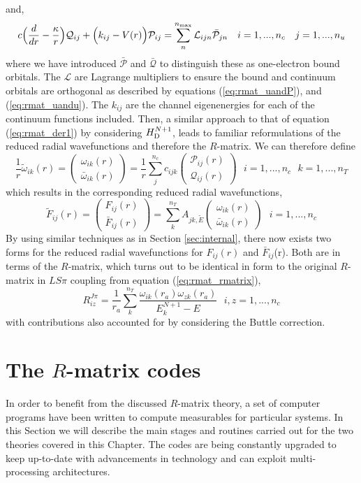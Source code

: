 and,
\[
c\Big(\frac{d}{dr} - \frac{\kappa}{r}\Big)\mathcal{Q}_{ij} + \Big(k_{ij} -V(r)\Big)\mathcal{P}_{ij} =\sum_{n}^{n_{\rm max}}\mathcal{L}_{ijn}\mathcal{\bar{P}}_{jn} ~~~ i=1,...,n_c  ~~~ j=1,...,n_u
\]
where we have introduced $\mathcal{\bar{P}}$ and $\mathcal{\bar{Q}}$ to distinguish these as one-electron bound orbitals. The $\mathcal{L}$ are Lagrange multipliers to ensure the bound and continuum orbitals are orthogonal as described by equations (\ref{eq:rmat_uandP}), and (\ref{eq:rmat_uandu}). The $k_{ij}$ are the channel eigenenergies for each of the continuum functions included. Then, a similar approach to that of equation (\ref{eq:rmat_der1}) by considering $H_{\rm D}^{N+1}$, leads to familiar reformulations of the reduced radial wavefunctions and therefore the $R$-matrix. We can therefore define
\[
\frac{1}{r}\tilde{\omega}_{ik}(r)= \left ( \begin{array}{c}
\omega_{ik}(r)  \\
\bar{\omega}_{ik}(r)   \end{array} \right) = \frac{1}{r}\sum_j^{n_c}c_{ijk} \left( \begin{array}{c}
\mathcal{P}_{ij}(r)  \\
\mathcal{Q}_{ij}(r)   \end{array} \right) ~~~ i=1,...,n_c ~~~ k=1,...,n_T
\]
which results in the corresponding reduced radial wavefunctions,
\[
\tilde{F}_{ij}(r) =  \left ( \begin{array}{c}
F_{ij}(r)  \\
\bar{F}_{ij}(r)   \end{array} \right) = \sum_{k}^{n_T}A_{jk,\tilde{E}} \left ( \begin{array}{c}
\omega_{ik}(r)  \\
\bar{\omega}_{ik}(r)   \end{array} \right)  ~~~ i=1,...,n_c      
\]
By using similar techniques as in Section \ref{sec:internal}, there now exists two forms for the reduced radial wavefunctions for $F_{ij}(r)$ and $\bar{F}_{ij}$(r). Both are in terms of the $R$-matrix, which turns out to be identical in form to the original $R$-matrix in $LS\pi$ coupling from equation (\ref{eq:rmat_rmatrix}), 
\[
R^{J\pi}_{iz} = \frac{1}{r_a}\sum_{k}^{n_T}\frac{\omega_{ik}(r_a)\omega_{zk}(r_a)}{E^{N+1}_k-E} ~~~ i,z=1,...,n_c
\]
with contributions also accounted for by considering the Buttle correction.

\section{The $R$-matrix codes}\label{sec:codes}
In order to benefit from the discussed $R$-matrix theory, a set of computer programs have been written to compute measurables for particular systems. In this Section we will describe the main stages and routines carried out for the two theories covered in this Chapter. The codes are being constantly upgraded to keep up-to-date with advancements in technology and can exploit multi-processing architectures.

